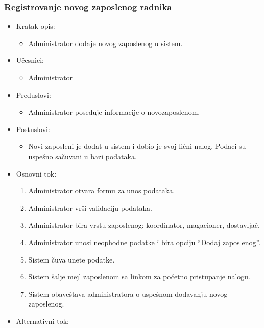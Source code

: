 \subsubsection{Registrovanje novog zaposlenog radnika}

\begin{itemize}
    \item Kratak opis:
        \begin{itemize}
            \item Administrator dodaje novog zaposlenog u sistem.
        \end{itemize}
    \item Učesnici:
        \begin{itemize}
            \item Administrator
        \end{itemize}
    \item Preduslovi:
        \begin{itemize}
            \item Administrator poseduje informacije o novozaposlenom.
        \end{itemize}
    \item Postuslovi:
        \begin{itemize}
            \item Novi zaposleni je dodat u sistem i dobio je svoj lični nalog. Podaci su uspešno sačuvani u bazi podataka.
        \end{itemize}
    \item Osnovni tok:
        \begin{enumerate}
         \item Administrator otvara formu za unos podataka.
         \item Administrator vrši validaciju podataka.
         \item Administrator bira vrstu zaposlenog: koordinator, magacioner, dostavljač.
         \item Administrator unosi neophodne podatke i bira opciju ``Dodaj zaposlenog''.
         \item Sistem čuva unete podatke.
         \item Sistem šalje mejl zaposlenom sa linkom za početno pristupanje nalogu.
         \item Sistem obaveštava administratora o uspešnom dodavanju novog zaposlenog.
        \end{enumerate}
    \item Alternativni tok:
        \begin{itemize}

\end{itemize}
\end{itemize}

